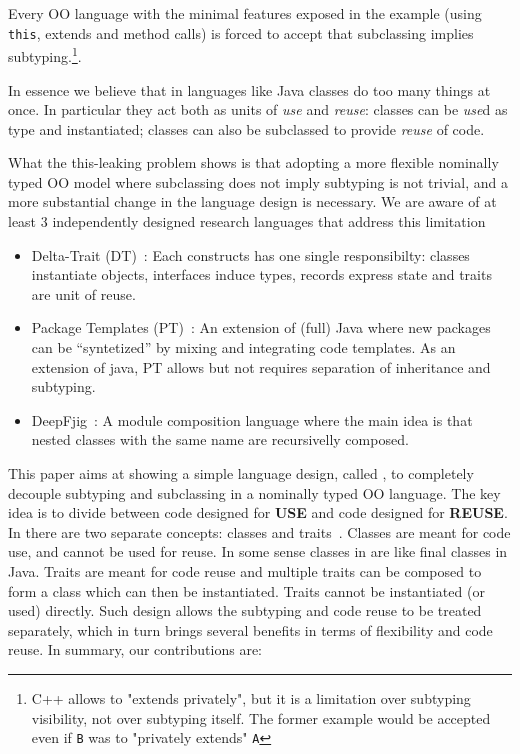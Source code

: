 Every OO language with the minimal features exposed in the example (using \lstinline{this},
extends and method calls) is forced to accept that subclassing implies
subtyping.\footnote{C++ allows to "extends privately", but it is a limitation over
  subtyping visibility, not over subtyping itself.  The
  former example would be accepted even if \lstinline{B} was to
  "privately extends" \lstinline{A}}.
  
In essence we believe that in
languages like Java classes
do too many things at once. In particular they 
act both as units of \emph{use} and \emph{reuse}:
 classes can be \emph{use}d as
type and instantiated; classes can also be subclassed to provide
\emph{reuse} of code.

What the this-leaking problem shows is that 
adopting a more flexible nominally typed OO model where subclassing
does not imply subtyping is not trivial, and a more substantial change
in the language design is necessary. 
We are aware of at least 3 independently designed research languages 
that address this limitation
\begin{itemize}
\item Delta-Trait (DT)~\cite{Bettini:2010:ISP:1774088.1774530,BETTINI2013521,Bettini2015282}:
Each  constructs  has one single responsibilty: classes instantiate objects,
interfaces induce types, records express state and traits are unit of reuse.
\item Package Templates (PT)~\cite{KrogdahlMS09,DBLP:journals/taosd/AxelsenSKM12,DBLP:conf/gpce/AxelsenK12}:
An extension of (full) Java where new packages can be ``syntetized'' by mixing
and integrating code templates. As an extension of java, PT allows but not requires
separation of inheritance and subtyping.
\item DeepFjig~\cite{deep,servetto2014meta,DBLP:journals/iandc/LagorioSZ12}:
A module composition language where the main idea is that
nested classes with the same name are recursivelly composed.
\end{itemize}

This paper aims at showing a simple language design, called \name, to
completely decouple subtyping and subclassing in a nominally typed OO
language. The key idea is to divide between code designed for
\textbf{USE} and code designed for \textbf{REUSE}. 
In \name there are two separate concepts: classes
and traits~\cite{Traits:ECOOP2003}. Classes are meant for code use, and cannot be used
for reuse. In some sense classes in \name are like final classes in
Java. Traits are meant for code reuse and multiple traits can be
composed to form a class which can then be instantiated. Traits 
cannot be instantiated (or used) directly. Such design allows the
subtyping and code reuse to be treated separately, which in turn
brings several benefits in terms of flexibility and code reuse.
In summary, our contributions are:

